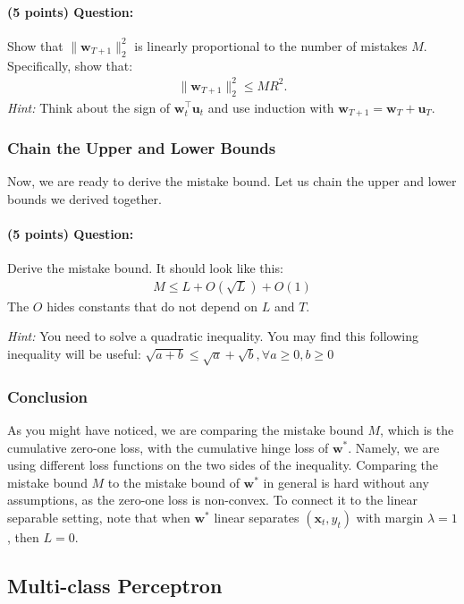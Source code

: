 \documentclass{article}
\begin{document}
\paragraph{(5 points) Question:}
Show that $\|\mathbf{w}_{T+1}\|_2^2$ is linearly proportional to the number of mistakes $M$. Specifically, show that:
\begin{align}
    \|\mathbf{w}_{T+1}\|_2^2\leq M R^2.
\end{align}
\textit{Hint:} Think about the sign of $\mathbf{w}_t^{\top} \mathbf{u}_t$ and use induction with $\mathbf{w}_{T+1} = \mathbf{w}_T + \mathbf{u}_T$. 

\subsubsection{Chain the Upper and Lower Bounds}
Now, we are ready to derive the mistake bound. Let us chain the upper and lower bounds we derived together.

\paragraph{(5 points) Question:} Derive the mistake bound. It should look like this:
\begin{align}
    M \leq L + O(\sqrt{L}) + O(1)
\end{align} The $O$ hides constants that do not depend on $L$ and $T$. 

\noindent\textit{Hint:} You need to solve a quadratic inequality. You may find this following inequality will be useful:
$\sqrt{a+b} \leq \sqrt{a} + \sqrt{b}, \forall a\geq 0, b\geq 0$

\subsubsection{Conclusion}

As you might have noticed, we are comparing the mistake bound $M$, which is the cumulative zero-one loss, with the cumulative hinge loss of $\mathbf{w}^*$. Namely, we are using different loss functions on the two sides of the inequality.
Comparing the mistake bound $M$ to the mistake bound of $\mathbf{w}^*$ in general is hard without any assumptions, as the zero-one loss is non-convex. 
To connect it to the linear separable setting, note that when $\mathbf{w}^*$ linear separates $(\mathbf{x}_t, y_t)$ with margin $\lambda = 1$, then $L = 0$. 

\subsection{Multi-class Perceptron}
\end{document}
